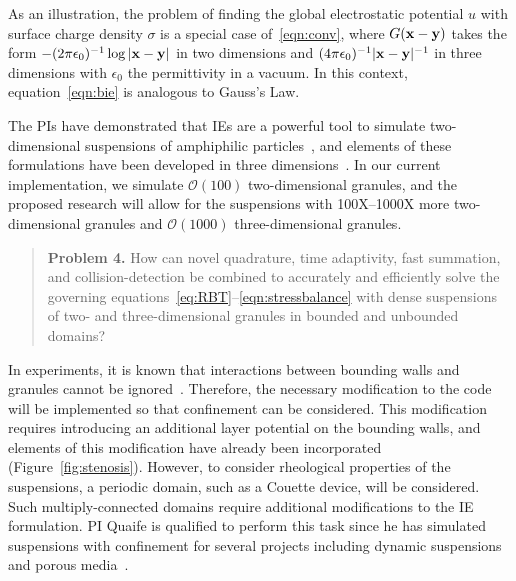 As an illustration, the problem of finding the global electrostatic
potential $u$ with surface charge density $\sigma$ is a special case
of~\eqref{eqn:conv}, where $G(\mathbf{x} - \mathbf{y})$ takes the form $-(2\pi
\epsilon_0)^{-1}\log|\mathbf{x} - \mathbf{y}|$ in two dimensions and $(4\pi
\epsilon_0)^{-1}|\mathbf{x} -\mathbf{y}|^{-1}$ in three dimensions with $\epsilon_0$
the permittivity in a vacuum. In this context, equation~\eqref{eqn:bie}
is analogous to Gauss's Law.

The PIs have demonstrated that IEs are a powerful tool to simulate
two-dimensional suspensions of amphiphilic particles~\cite{Fu2018_SIAM,
FuQuRyYo22, fu-ryh-qua-you2022}, and elements of these formulations have
been developed in three dimensions~\cite{ying_2006, manasthesis,
rac-gre2016}. In our current implementation, we simulate
$\mathcal{O}(100)$ two-dimensional granules, and the proposed research
will allow for the suspensions with 100X--1000X more two-dimensional
granules and $\mathcal{O}(1000)$ three-dimensional granules. 

\begin{quotation}
  \noindent
  \textbf{Problem 4.} How can novel quadrature, time adaptivity, fast
  summation, and collision-detection be combined to accurately and
  efficiently solve the governing
  equations~\eqref{eq:RBT}--\eqref{eqn:stressbalance} with dense
  suspensions of two- and three-dimensional granules in bounded and
  unbounded domains?
\end{quotation}
In experiments, it is known that interactions between bounding walls and
granules cannot be ignored~\cite{qua-gan-you2021,
KaouiHartingMisbah2011_PRE, her-sto-gra2005}. Therefore, the necessary
modification to the code will be implemented so that confinement can be
considered. This modification requires introducing an additional layer
potential on the bounding walls, and elements of this modification have
already been incorporated (Figure~\ref{fig:stenosis}). However, to
consider rheological properties of the suspensions, a periodic domain,
such as a Couette device, will be considered. Such multiply-connected
domains require additional modifications to the IE formulation. PI
Quaife is qualified to perform this task since he has simulated
suspensions with confinement for several projects including dynamic
suspensions~\cite{qua-bir2014, bys-sha-qua2020} and porous
media~\cite{chi-moo-qua2020, dea-qua-bir-jua2018, moo-che-chi-qua2022,
qua-gan-you2021}.

